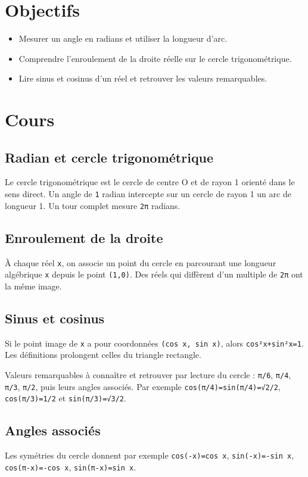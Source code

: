 \section{Objectifs}
\begin{itemize}
\item Mesurer un angle en radians et utiliser la longueur d'arc.
\item Comprendre l'enroulement de la droite réelle sur le cercle trigonométrique.
\item Lire sinus et cosinus d'un réel et retrouver les valeurs remarquables.
\end{itemize}

\section{Cours}
\subsection{Radian et cercle trigonométrique}
Le cercle trigonométrique est le cercle de centre O et de rayon 1 orienté dans le sens direct. Un angle de \texttt{1} radian intercepte sur un cercle de rayon 1 un arc de longueur 1. Un tour complet mesure \texttt{2π} radians.

\subsection{Enroulement de la droite}
À chaque réel \texttt{x}, on associe un point du cercle en parcourant une longueur algébrique \texttt{x} depuis le point \texttt{(1,0)}. Des réels qui diffèrent d'un multiple de \texttt{2π} ont la même image.

\subsection{Sinus et cosinus}
Si le point image de \texttt{x} a pour coordonnées \texttt{(cos x, sin x)}, alors \texttt{cos²x+sin²x=1}. Les définitions prolongent celles du triangle rectangle.

Valeurs remarquables à connaître et retrouver par lecture du cercle : \texttt{π/6}, \texttt{π/4}, \texttt{π/3}, \texttt{π/2}, puis leurs angles associés. Par exemple \texttt{cos(π/4)=sin(π/4)=√2/2}, \texttt{cos(π/3)=1/2} et \texttt{sin(π/3)=√3/2}.

\subsection{Angles associés}
Les symétries du cercle donnent par exemple \texttt{cos(-x)=cos x}, \texttt{sin(-x)=-sin x}, \texttt{cos(π-x)=-cos x}, \texttt{sin(π-x)=sin x}.

